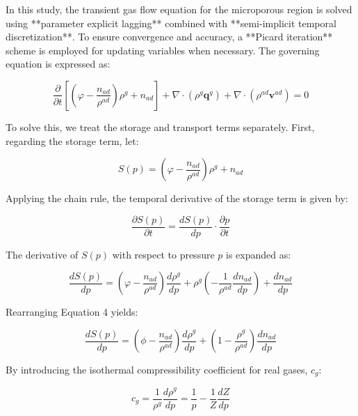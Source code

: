 \documentclass{article}
\begin{document}
In this study, the transient gas flow equation for the microporous region is solved using **parameter explicit lagging** combined with **semi-implicit temporal discretization**. To ensure convergence and accuracy, a **Picard iteration** scheme is employed for updating variables when necessary. The governing equation is expressed as:

\begin{equation}
    \frac{\partial}{\partial t}\left[\left(\varphi-\frac{n_{ad}}{\rho^{ad}}\right) \rho^{g}+n_{ad}\right]+\nabla \cdot\left(\rho^{g} \mathbf{q}^{g}\right)+\nabla \cdot\left(\rho^{ad} \mathbf{v}^{ad}\right)=0
\end{equation}

To solve this, we treat the storage and transport terms separately. First, regarding the storage term, let:

\begin{equation}
    S(p)=\left(\varphi -\frac{n_{ad}}{\rho^{ad}}\right) \rho^{g}+n_{ad}
\end{equation}

Applying the chain rule, the temporal derivative of the storage term is given by:

\begin{equation}
    \frac{\partial S(p)}{\partial t}=\frac{d S(p)}{d p} \cdot \frac{\partial p}{\partial t}
\end{equation}

The derivative of $S(p)$ with respect to pressure $p$ is expanded as:

\begin{equation}
    \frac{d S(p)}{d p}=\left(\varphi-\frac{n_{ad}}{\rho^{ad}}\right) \frac{d \rho^{g}}{d p}+\rho^{g}\left(-\frac{1}{\rho^{ad}} \frac{d n_{ad}}{d p}\right)+\frac{d n_{ad}}{d p}
\end{equation}

Rearranging Equation 4 yields:

\begin{equation}
    \frac{d S(p)}{d p}=\left(\phi-\frac{n_{ad}}{\rho^{ad}}\right) \frac{d \rho^{g}}{d p}+\left(1-\frac{\rho^{g}}{\rho^{ad}}\right) \frac{d n_{ad}}{d p}
\end{equation}

By introducing the isothermal compressibility coefficient for real gases, $c_g$:

\begin{equation}
    c_{g}=\frac{1}{\rho^{g}} \frac{d \rho^{g}}{d p}=\frac{1}{p}-\frac{1}{Z} \frac{d Z}{d p}
\end{equation}
\end{document}
